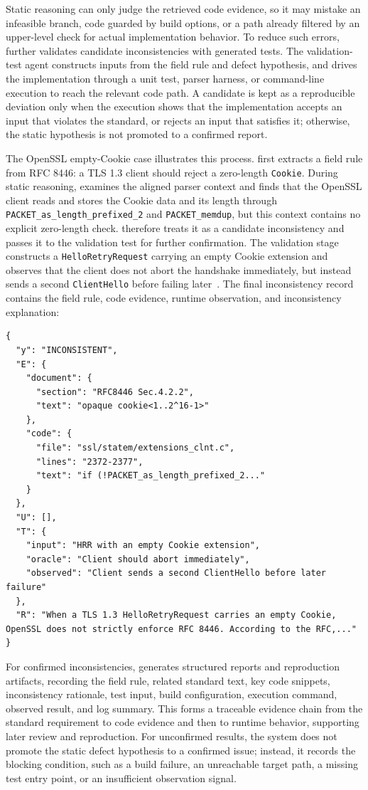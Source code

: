 Static reasoning can only judge the retrieved code evidence, so it may mistake
an infeasible branch, code guarded by build options, or a path already filtered
by an upper-level check for actual implementation behavior. To reduce such
errors, \tool{} further validates candidate inconsistencies with generated
tests. The validation-test agent constructs inputs from the field rule and
defect hypothesis, and drives the implementation through a unit test, parser
harness, or command-line execution to reach the relevant code path. A candidate
is kept as a reproducible deviation only when the execution shows that the
implementation accepts an input that violates the standard, or rejects an input
that satisfies it; otherwise, the static hypothesis is not promoted to a
confirmed report.

The OpenSSL empty-Cookie case illustrates this process. \tool{} first extracts
a field rule from RFC 8446: a TLS 1.3 client should reject a zero-length
\texttt{Cookie}. During static reasoning, \tool{} examines the aligned parser
context and finds that the OpenSSL client reads and stores the Cookie data and
its length through \texttt{PACKET\_as\_length\_prefixed\_2} and
\texttt{PACKET\_memdup}, but this context contains no explicit zero-length
check. \tool{} therefore treats it as a candidate inconsistency and passes it
to the validation test for further confirmation. The validation stage
constructs a \texttt{HelloRetryRequest} carrying an empty Cookie extension and
observes that the client does not abort the handshake immediately, but instead
sends a second \texttt{ClientHello} before failing later~\cite{opensslissue30868}.
The final inconsistency record contains the field rule, code evidence, runtime
observation, and inconsistency explanation:
\begin{lstlisting}[style=jsonsnippet]
{
  "y": "INCONSISTENT",
  "E": {
    "document": {
      "section": "RFC8446 Sec.4.2.2",
      "text": "opaque cookie<1..2^16-1>"
    },
    "code": {
      "file": "ssl/statem/extensions_clnt.c",
      "lines": "2372-2377",
      "text": "if (!PACKET_as_length_prefixed_2..."
    }
  },
  "U": [],
  "T": {
    "input": "HRR with an empty Cookie extension",
    "oracle": "Client should abort immediately",
    "observed": "Client sends a second ClientHello before later failure"
  },
  "R": "When a TLS 1.3 HelloRetryRequest carries an empty Cookie, OpenSSL does not strictly enforce RFC 8446. According to the RFC,..."
}
\end{lstlisting}

For confirmed inconsistencies, \tool{} generates structured reports and reproduction
artifacts, recording the field rule, related standard text, key code snippets, 
inconsistency rationale, test input, build configuration, execution command, 
observed result, and log summary. This forms a traceable evidence chain from the 
standard requirement to code evidence and then to runtime behavior, supporting 
later review and reproduction. For unconfirmed results, the system does not 
promote the static defect hypothesis to a confirmed issue; instead, it records 
the blocking condition, such as a build failure, an unreachable target path, 
a missing test entry point, or an insufficient observation signal.


